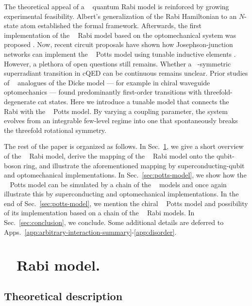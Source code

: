 \documentclass[reprint, aps, prx, amsmath, amssymb, longbibliography, superscriptaddress]{revtex4-2}
\DeclareMathOperator{\Zthree}{\mathbb{Z}_3}
\begin{document}
The theoretical appeal of a $\Zthree$ quantum Rabi model is reinforced by growing experimental feasibility. Albert’s generalization of the Rabi Hamiltonian to an $N$-state atom \cite{albert_quantum_2012}established the formal framework. Afterwards, the first implementation of the $\Zthree$ Rabi model based on the optomechanical system was proposed \cite{sedov_chiral_2020}. Now, recent circuit proposals have shown how Josephson-junction networks can implement the $\Zthree$ Potts model using tunable inductive elements \cite{wauters_engineering_2024}. However, a plethora of open questions still remains. Whether a $\Zthree$-symmetric superradiant transition in cQED can be continuous remains unclear. Prior studies of $\Zthree$ analogues of the Dicke model --- for example in chiral waveguide optomechanics --- found predominantly first-order transitions with threefold-degenerate cat states. Here we introduce a tunable model that connects the $\Zthree$ Rabi with the $\Zthree$ Potts model. By varying a coupling parameter, the system evolves from an integrable few-level regime into one that spontaneously breaks the threefold rotational symmetry. 

The rest of the paper is organized as follows. In Sec.~\ref{sec:z3-rabi}, we give a short overview of the $\Zthree$ Rabi model, derive the mapping of the $\Zthree$ Rabi model onto the qubit-boson ring, and illustrate the aforementioned mapping by superconducting-qubit and optomechanical implementations. In Sec.~\ref{sec:potts-model}, we show how the $\Zthree$ Potts model can be simulated by a chain of the $\Zthree$ models and once again illustrate this by superconducting and optomechanical implementations. In the end of Sec.~\ref{sec:potts-model}, we mention the chiral $\Zthree$ Potts model and possibility of its implementation based on a chain of the $\Zthree$ Rabi models. In Sec.~\ref{sec:conclusion}, we conclude. Some additional details are deferred to Apps.~\ref{app:arbitrary-interaction-summary}-\ref{app:disorder}.



\section{\texorpdfstring{$\Zthree$}{Z\_3} Rabi model.}
\label{sec:z3-rabi}

\subsection{Theoretical description}
\label{sec:rabi-theory}
\end{document}
